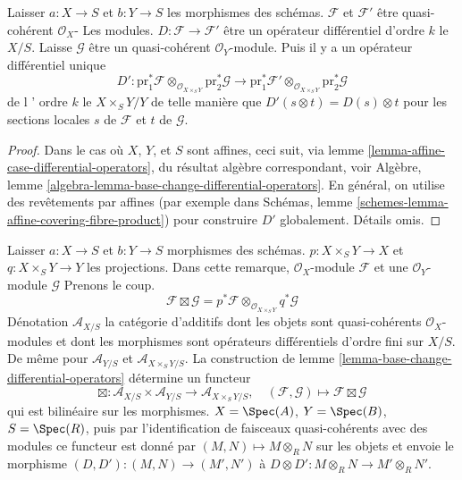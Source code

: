 \begin{lemma}

\label{lemma-base-change-differential-operators}

Laisser $a : X \to S$ et $b : Y \to S$ les morphismes des schémas. $\mathcal{F}$ et $\mathcal{F}'$ être quasi-cohérent $\mathcal{O}_X$- Les modules. $D : \mathcal{F} \to \mathcal{F}'$ être un opérateur différentiel d'ordre $k$ le $X/S$. Laisse $\mathcal{G}$ être un quasi-cohérent
$\mathcal{O}_Y$-module. Puis il y a un opérateur différentiel unique
$$
D' :
\text{pr}_1^*\mathcal{F} \otimes_{\mathcal{O}_{X \times_S Y}}
\text{pr}_2^*\mathcal{G}
\longrightarrow
\text{pr}_1^*\mathcal{F}' \otimes_{\mathcal{O}_{X \times_S Y}}
\text{pr}_2^*\mathcal{G}
$$
de l ' ordre $k$ le $X \times_S Y / Y$ de telle manière que
$
D'(s \otimes t) = D(s) \otimes t
$
pour les sections locales $s$ de $\mathcal{F}$ et $t$ de $\mathcal{G}$.

\end{lemma}

\begin{proof}
Dans le cas où $X$, $Y$, et $S$ sont affines, ceci suit, via lemme \ref{lemma-affine-case-differential-operators}, du résultat algèbre correspondant, voir Algèbre, lemme \ref{algebra-lemma-base-change-differential-operators}. En général, on utilise des revêtements par affines (par exemple dans Schémas, lemme \ref{schemes-lemma-affine-covering-fibre-product}) pour construire $D'$ globalement. Détails omis.
\end{proof}

\begin{remark}

\label{remark-base-change-differential-operators}

Laisser $a : X \to S$ et $b : Y \to S$ morphismes des schémas. $p : X \times_S Y \to X$ et $q : X \times_S Y \to Y$ les projections. Dans cette remarque, $\mathcal{O}_X$-module $\mathcal{F}$
et une $\mathcal{O}_Y$-module $\mathcal{G}$ Prenons le coup.
$$
\mathcal{F} \boxtimes \mathcal{G} =
p^*\mathcal{F} \otimes_{\mathcal{O}_{X \times_S Y}} q^*\mathcal{G}
$$
Dénotation $\mathcal{A}_{X/S}$ la catégorie d'additifs dont les objets sont quasi-cohérents $\mathcal{O}_X$-modules et dont les morphismes sont opérateurs différentiels d'ordre fini sur $X/S$. De même pour $\mathcal{A}_{Y/S}$ et $\mathcal{A}_{X \times_S Y/S}$. La construction de lemme \ref{lemma-base-change-differential-operators}
détermine un functeur
$$
\boxtimes : 
\mathcal{A}_{X/S} \times \mathcal{A}_{Y/S} \longrightarrow
\mathcal{A}_{X \times_S Y/S},
\quad
(\mathcal{F}, \mathcal{G}) \longmapsto \mathcal{F} \boxtimes \mathcal{G}
$$
qui est bilinéaire sur les morphismes. $X = \Spec(A)$, $Y = \Spec(B)$,
$S = \Spec(R)$, puis par l'identification de faisceaux quasi-cohérents avec des modules ce functeur est donné par $(M, N) \mapsto M \otimes_R N$
sur les objets et envoie le morphisme $(D, D') : (M, N) \to (M', N')$ à
$D \otimes D' : M \otimes_R N \to M' \otimes_R N'$.

\end{remark}








